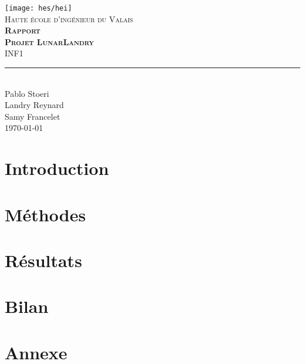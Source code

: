 \documentclass[11pt,titlepage]{report}
\def\Autora{Pablo Stoeri}
\def\Autorb{Landry Reynard}
\def\Autorc{Samy Francelet}
\begin{document}
\begin{titlepage}
	\centering
    \texttt{[image: hes/hei]}\\[1cm] 	%
    \textsc{\LARGE Haute école d'ingénieur du Valais}\\ \vspace{\fill}
    \textbf{\textsc{\fontsize{50}{50}\selectfont Rapport}}\\[0.8cm]
		\textbf{\textsc{\fontsize{30}{30}\selectfont Projet LunarLandry}}\\ \vspace{\fill}
	\textsc{\LARGE INF1}\\[0.4cm]
	\rule{\linewidth}{0.2 mm} \\[0.5 cm]
		\Autora \\
		\Autorb \\
		\Autorc \\[2cm]
	\today
\end{titlepage}
\restoregeometry

\tableofcontents

\chapter{Introduction}


\chapter{Méthodes}


\chapter{Résultats}


\chapter{Bilan}


\chapter{Annexe}

\end{document}
